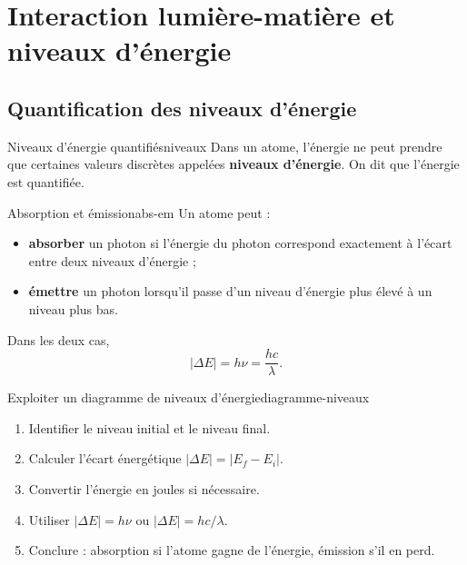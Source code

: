 \documentclass[11pt,a4paper]{article}
\begin{document}
\section{Interaction lumière-matière et niveaux d'énergie}

\subsection{Quantification des niveaux d'énergie}

\begin{definitionbox}{Niveaux d'énergie quantifiés}{niveaux}
Dans un atome, l'énergie ne peut prendre que certaines valeurs discrètes appelées \textbf{niveaux d'énergie}. On dit que l'énergie est quantifiée.
\end{definitionbox}

\begin{propositionbox}{Absorption et émission}{abs-em}
Un atome peut :
\begin{itemize}
  \item \textbf{absorber} un photon si l'énergie du photon correspond exactement à l'écart entre deux niveaux d'énergie ;
  \item \textbf{émettre} un photon lorsqu'il passe d'un niveau d'énergie plus élevé à un niveau plus bas.
\end{itemize}
Dans les deux cas,
\[
\boxed{|\Delta E|=h\nu=\frac{hc}{\lambda}}.
\]
\end{propositionbox}

\begin{center}
\end{center}

\begin{methodbox}{Exploiter un diagramme de niveaux d'énergie}{diagramme-niveaux}
\begin{enumerate}[label=\arabic*)]
  \item Identifier le niveau initial et le niveau final.
  \item Calculer l'écart énergétique $|\Delta E|=|E_f-E_i|$.
  \item Convertir l'énergie en joules si nécessaire.
  \item Utiliser $|\Delta E|=h\nu$ ou $|\Delta E|=hc/\lambda$.
  \item Conclure : absorption si l'atome gagne de l'énergie, émission s'il en perd.
\end{enumerate}
\end{methodbox}
\end{document}
